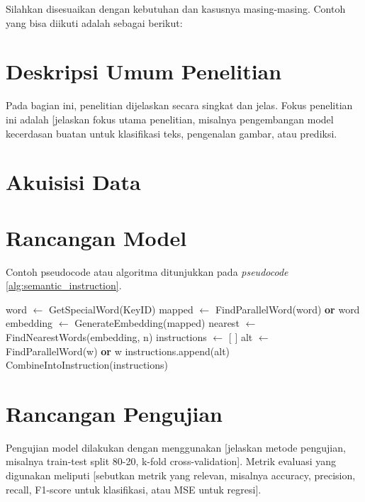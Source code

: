 Silahkan disesuaikan dengan kebutuhan dan kasusnya masing-masing. Contoh yang bisa diikuti adalah sebagai berikut: 

\section{Deskripsi Umum Penelitian}
Pada bagian ini, penelitian dijelaskan secara singkat dan jelas. Fokus penelitian ini adalah [jelaskan fokus utama penelitian, misalnya pengembangan model kecerdasan buatan untuk klasifikasi teks, pengenalan gambar, atau prediksi.

\section{Akuisisi Data}

\section{Rancangan Model}
Contoh pseudocode atau algoritma ditunjukkan pada \textit{pseudocode} \ref{alg:semantic_instruction}.

\begin{algorithm}[H]
\caption{Generate Semantic-Based Instructions}
\label{alg:semantic_instruction}
\begin{algorithmic}[1]
    \State word $\gets$ GetSpecialWord(KeyID)
    \State mapped $\gets$ FindParallelWord(word) \textbf{or} word
    \State embedding $\gets$ GenerateEmbedding(mapped)
    \State nearest $\gets$ FindNearestWords(embedding, n)
    \State instructions $\gets$ [ ]
        \State alt $\gets$ FindParallelWord(w) \textbf{or} w
        \State instructions.append(alt)
    \EndFor
    \State \Return CombineIntoInstruction(instructions)
\EndProcedure
\end{algorithmic}
\end{algorithm}




\section{Rancangan Pengujian}
Pengujian model dilakukan dengan menggunakan [jelaskan metode pengujian, misalnya train-test split 80-20, k-fold cross-validation]. Metrik evaluasi yang digunakan meliputi [sebutkan metrik yang relevan, misalnya accuracy, precision, recall, F1-score untuk klasifikasi, atau MSE untuk regresi].


